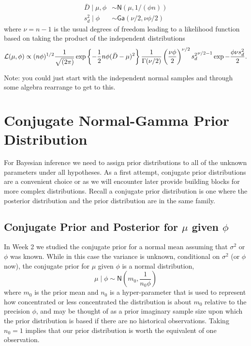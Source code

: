 \documentclass[11pt]{article}
\def\No{\textsf{N}}
\def\Ga{\textsf{Ga}}
\begin{document}
\begin{align}
 \bar{D} \mid \mu, \phi & \sim \No\left(\mu,  1/(\phi n)\right) \\
 s^2_d \mid \phi & \sim  \Ga(\nu/2,  \nu \phi/2 )
\end{align}
where $\nu = n-1 $ is the usual degrees of freedom leading to a likelihood function based on taking the product of the independent distributions 
$$
{\cal{L}}(\mu, \phi) \propto (n\phi)^{1/2} \frac{1}{\sqrt{(2 \pi)}} 
\exp\left\{- \frac 1 2  n \phi (\bar{D} - \mu)^2 \right\}
\frac{1 }{\Gamma(\nu/2)} \left(\frac{\nu \phi}{2}\right)^{\nu/2} {s^2_d}^{\nu/2 - 1} \exp{- \frac{\phi \nu s^2_d}{2}}.
$$

Note:  you could just start with the independent normal samples and through some algebra rearrange to get to this.

\section*{Conjugate Normal-Gamma Prior Distribution}


For Bayesian inference we need to assign prior distributions to all of the unknown parameters under all hypotheses. As a first attempt, conjugate prior distributions are a convenient choice or as we will encounter later provide building blocks for more complex distributions. Recall a conjugate prior distribution is one where the posterior distribution and the prior distribution are in the same family. 

\subsection*{Conjugate Prior and Posterior for $\mu$ given $\phi$}

In Week 2 we studied the conjugate prior for a normal mean assuming that $\sigma^2$ or $\phi$ was known.   While in this case the variance is unknown, 
conditional on $\sigma^2$ (or $\phi$ now), the conjugate prior for $\mu$ given $\phi$ is a normal distribution,  
$$ \mu \mid \phi \sim \No \left(m_0, \frac{1}{n_0 \phi} \right)
$$
where $m_0$ is the prior mean and $n_0$ is a hyper-parameter that is used to represent
how concentrated or less concentrated the distribution is about $m_0$ relative to the precision $\phi$, and may be
thought of as a prior imaginary sample size upon which the prior distribution is 
based if there are no historical observations. Taking $n_0 = 1$ implies that our prior distribution is worth the 
equivalent of one observation.  
\end{document}
